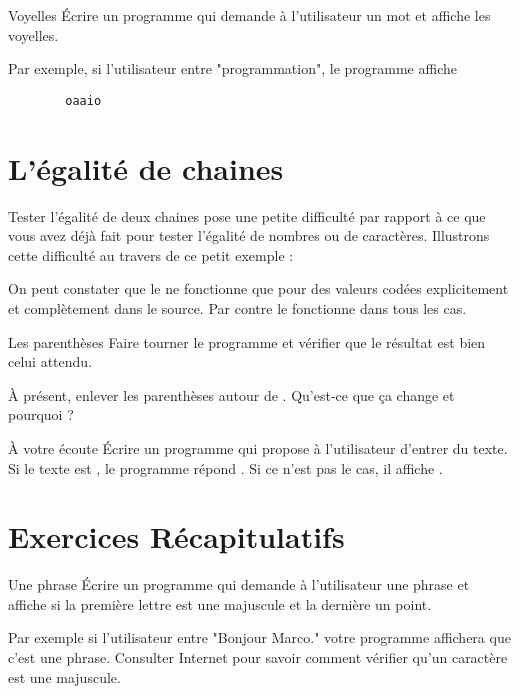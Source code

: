 \documentclass[a4paper,11pt]{style-esi/td}
\begin{document}
	\begin{Exercice}{Voyelles}	
		\'Ecrire un programme qui demande à l'utilisateur 
		un mot et affiche les voyelles.
		
		Par exemple, si l'utilisateur entre "programmation", le programme affiche
		
		\begin{verbatim}
		oaaio
		\end{verbatim}
	\end{Exercice}

\section{L'égalité de chaines}

	Tester l'égalité de deux chaines pose une petite difficulté
	par rapport à ce que vous avez déjà fait pour tester l'égalité de nombres
	ou de caractères.
	Illustrons cette difficulté au travers de ce petit exemple :


	On peut constater que le \samp{==}
	ne fonctionne que pour des valeurs codées explicitement et complètement dans le source.
	Par contre le  fonctionne dans tous les cas.

	\begin{Exercice}{Les parenthèses}	
		Faire tourner le programme 
		et vérifier que le résultat est bien celui attendu.
		
		À présent, enlever les parenthèses autour de .
		Qu'est-ce que ça change et pourquoi ?
	\end{Exercice}

	\begin{Exercice}{À votre écoute}	
		Écrire un programme qui propose à l'utilisateur d'entrer du texte. 
		Si le texte est , 
		le programme répond .
		Si ce n'est pas le cas, il affiche . 
	\end{Exercice}

\section{Exercices Récapitulatifs}

	\begin{Exercice}{Une phrase}	
		\'Ecrire un programme qui demande à l'utilisateur 
		une phrase et affiche si la première lettre est une majuscule et la dernière un point.
		
		Par exemple si l'utilisateur entre "Bonjour Marco." votre programme affichera que c'est une phrase.
		Consulter Internet pour savoir comment vérifier qu'un caractère est une majuscule. 
		
	\end{Exercice}
\end{document}
